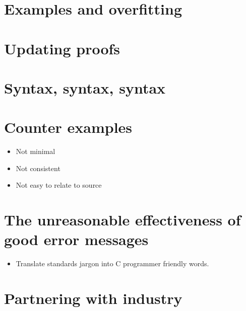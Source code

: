 \section{Examples and overfitting}

\section{Updating proofs}

\section{Syntax, syntax, syntax}

\section{Counter examples}\label{sec:counter-ex}

\begin{itemize}
    \item Not minimal
    \item Not consistent
    \item Not easy to relate to source
\end{itemize}

\section{The unreasonable effectiveness of good error messages}\label{sec:error-msgs}

\begin{itemize}
    \item Translate standards jargon into C programmer friendly words.
\end{itemize}

\section{Partnering with industry}

